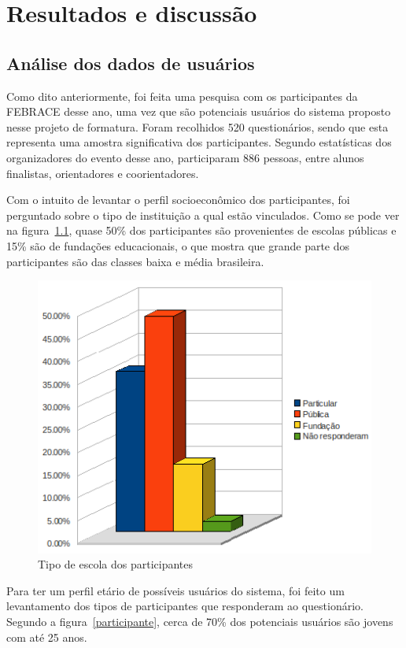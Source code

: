 
\chapter{Resultados e discussão}

\section{Análise dos dados de usuários}

  Como dito anteriormente, foi feita uma pesquisa com os participantes da FEBRACE desse ano, uma vez que são potenciais usuários do sistema proposto
nesse projeto de formatura. Foram recolhidos 520 questionários, sendo que esta representa uma amostra significativa dos participantes. Segundo 
estatísticas dos organizadores do evento desse ano, participaram 886 pessoas, entre alunos finalistas, orientadores e coorientadores.

  Com o intuito de levantar o perfil socioeconômico dos participantes, foi perguntado sobre o tipo de instituição a qual estão vinculados. Como se 
pode ver na figura~\ref{escola}, quase 50\% dos participantes são provenientes de escolas públicas e 15\% são de fundações educacionais, o que mostra
que grande parte dos participantes são das classes baixa e média brasileira.

  \begin{figure}
      \begin{center}
	\includegraphics[width=0.7\linewidth]{arquivos/escola.png}
      \end{center}
      \caption{Tipo de escola dos participantes}
      \label{escola}
  \end{figure}

  Para ter um perfil etário de possíveis usuários do sistema, foi feito um levantamento dos tipos de participantes que responderam ao questionário. 
Segundo a figura~\ref{participante}, cerca de 70\% dos potenciais usuários são jovens com até 25 anos.

